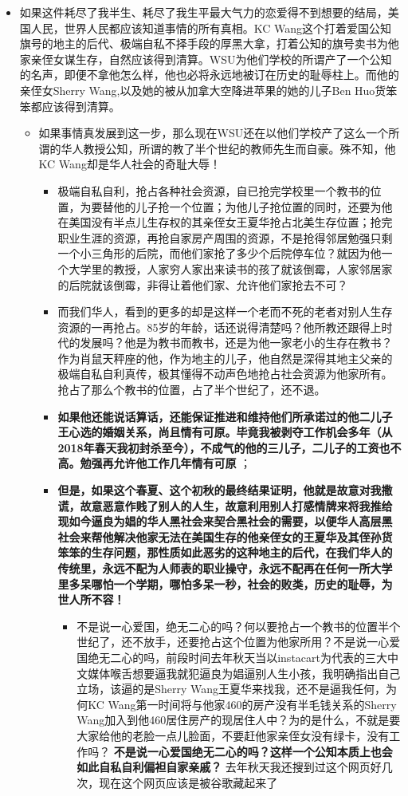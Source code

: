 \documentclass[9pt, b5paper]{article}
\begin{document}
\begin{itemize}
\item 如果这件耗尽了我半生、耗尽了我生平最大气力的恋爱得不到想要的结局，美国人民，世界人民都应该知道事情的所有真相。KC Wang这个打着爱国公知旗号的地主的后代、极端自私不择手段的厚黑大拿，打着公知的旗号卖书为他家亲侄女谋生存，自然应该得到清算。WSU为他们学校的所谓产了一个公知的名声，即便不拿他怎么样，他也必将永远地被订在历史的耻辱柱上。而他的亲侄女Sherry Wang,以及她的被从加拿大空降进苹果的她的儿子Ben Huo货笨笨都应该得到清算。
\begin{itemize}
\item 如果事情真发展到这一步，那么现在WSU还在以他们学校产了这么一个所谓的华人教授公知，所谓的教了半个世纪的教师先生而自豪。殊不知，他KC Wang却是华人社会的奇耻大辱！
\begin{itemize}
\item 极端自私自利，抢占各种社会资源，自已抢完学校里一个教书的位置，为要替他的儿子抢一个位置；为他儿子抢位置的同时，还要为他在美国没有半点儿生存权的其亲侄女王夏华抢占北美生存位置；抢完职业生涯的资源，再抢自家房产周围的资源，不是抢得邻居勉强只剩一个小三角形的后院，而他们家抢了多少个后院停车位？就因为他一个大学里的教授，人家穷人家出来读书的孩了就该倒霉，人家邻居家的后院就该倒霉，非得让着他们家、允许他们家抢去不可？
\item 而我们华人，看到的更多的却是这样一个老而不死的老者对别人生存资源的一再抢占。85岁的年龄，话还说得清楚吗？他所教还跟得上时代的发展吗？他是为教书而教书，还是为他一家老小的生存在教书？作为肖鼠天秤座的他，作为地主的儿子，他自然是深得其地主父亲的极端自私自利真传，极其懂得不动声色地抢占社会资源为他家所有。抢占了那么个教书的位置，占了半个世纪了，还不退。
\item \textbf{如果他还能说话算话，还能保证推进和维持他们所承诺过的他二儿子王心选的婚姻关系，尚且情有可原。毕竟我被剥夺工作机会多年（从2018年春天我初封杀至今），不成气的他的三儿子，二儿子的工资也不高。勉强再允许他工作几年情有可原} ；
\item \textbf{但是，如果这个春夏、这个初秋的最终结果证明，他就是故意对我撒谎，故意恶意作贱了别人的人生，故意利用别人打感情牌来将我推给现如今逼良为娼的华人黑社会来契合黑社会的需要，以便华人高层黑社会来帮他解决他家无法在美国生存的他亲侄女的王夏华及其侄孙货笨笨的生存问题，那性质如此恶劣的这种地主的后代，在我们华人的传统里，永远不配为人师表的职业操守，永远不配再在任何一所大学里多呆哪怕一个学期，哪怕多呆一秒，社会的败类，历史的耻辱，为世人所不容！}
\begin{itemize}
\item 不是说一心爱国，绝无二心的吗？何以要抢占一个教书的位置半个世纪了，还不放手，还要抢占这个位置为他家所用？不是说一心爱国绝无二心的吗，前段时间去年秋天当以instacart为代表的三大中文媒体喉舌想要逼我就犯逼良为娼逼别人生小孩，我明确指出自己立场，该逼的是Sherry Wang王夏华来找我，还不是逼我任何，为何KC Wang第一时间将与他家460的房产没有半毛钱关系的Sherry Wang加入到他460居住房产的现居住人中？为的是什么，不就是要大家给他的老脸一点儿脸面，不要赶他家亲侄女没有绿卡，没有工作吗？ \textbf{不是说一心爱国绝无二心的吗？这样一个公知本质上也会如此自私自利偏袒自家亲戚？} 去年秋天我还搜到过这个网页好几次，现在这个网页应该是被谷歌藏起来了

\end{itemize}
\end{itemize}
\end{itemize}
\end{itemize}
\end{document}
